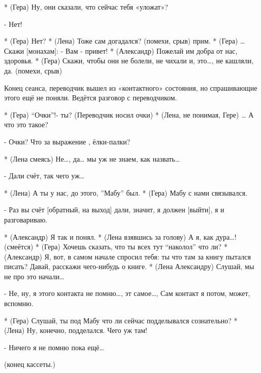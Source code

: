 * (Гера) Ну, они сказали, что сейчас тебя «уложат»?

- Нет!

* (Гера) Нет?
* (Лена) Тоже сам догадался?  (помехи, срыв) прим.
* (Гера) … Скажи [монахам]: - Вам - привет! 
* (Александр) Пожелай им добра от нас, здоровья.
* (Гера) Скажи, чтобы они не болели, не чихали и, это…, не кашляли, да. (помехи, срыв)

Конец сеанса, переводчик вышел из «контактного» состояния, но спрашивающие этого ещё не поняли.
Ведётся разговор с переводчиком.

* (Гера) “Очки”!- ты? (Переводчик носил очки)
* (Лена, не понимая, Гере) … А что это такое?

- Очки? Что за выражение , ёлки-палки?

* (Лена смеясь) Не…, да… мы уж не знаем, как назвать…

- Дали счёт, так чего уж… 

* (Лена) А ты у нас, до этого, ”Мабу” был.
* (Гера) Мабу с нами связывался.

- Раз вы счёт [обратный, на выход] дали, значит, я должен  [выйти], я и разговариваю.

* (Александр) Я так и понял.
* (Лена взявшись за голову) А я, как дура…! (смеётся)
* (Гера) Хочешь сказать, что ты всех тут “наколол” что ли? 
* (Александр) Я, вот, в самом начале спросил тебя: ты что там за книгу пытался писать? Давай, расскажи чего-нибудь о книге.
* (Лена Александру) Слушай, мы не про это начали…

- Не, ну, я этого контакта не помню…, эт самое…, Сам контакт я потом, может, вспомню.

* (Гера) Слушай, ты под Мабу что ли сейчас подделывался сознательно?
* (Лена) Ну, конечно, подделался. Чего уж там!

- Ничего я не помню пока ещё… 

(конец кассеты.)